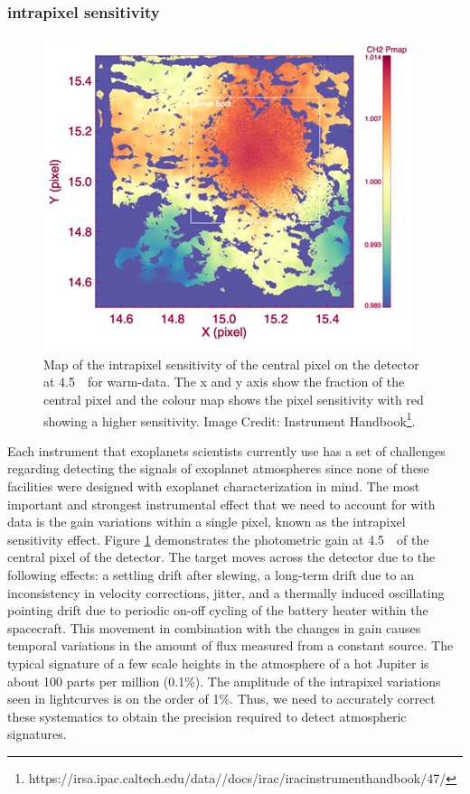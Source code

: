 \subsubsection{\spitzerIRAC intrapixel sensitivity}

\begin{figure}
    \centering
    \includegraphics[width = \linewidth]{IRAC_Instrument_Handbook183.png}
    \caption{Map of the intrapixel sensitivity of the central pixel on the detector at 4.5~\um~for warm-\spitzerIRAC data. The x and y axis show the fraction of the central pixel and the colour map shows the pixel sensitivity with red showing a higher sensitivity. Image Credit: \spitzerIRAC Instrument Handbook\footnote{https://irsa.ipac.caltech.edu/data/\spitzer/docs/irac/iracinstrumenthandbook/47/}.  }
    \label{int:fig:pmap}
\end{figure}

Each instrument that exoplanets scientists currently use has a set of challenges regarding detecting the signals of exoplanet atmospheres since none of these facilities were designed with exoplanet characterization in mind. The most important and strongest instrumental effect that we need to account for with \spitzer data is the gain variations within a single pixel, known as the intrapixel sensitivity effect. Figure \ref{int:fig:pmap} demonstrates the photometric gain at 4.5~\um~of the central pixel of the \spitzerIRAC detector. The target moves across the detector due to the following effects: a settling drift after slewing, a long-term drift due to an inconsistency in velocity corrections, jitter, and a thermally induced oscillating pointing drift due to periodic on-off cycling of the battery heater within the spacecraft. This movement in combination with the changes in gain causes temporal variations in the amount of flux measured from a constant source. The typical signature of a few scale heights in the atmosphere of a hot Jupiter is about 100 parts per million (0.1\%). The amplitude of the intrapixel variations seen in \spitzer lightcurves is on the order of 1\%. Thus, we need to accurately correct these systematics to obtain the precision required to detect atmospheric signatures.


